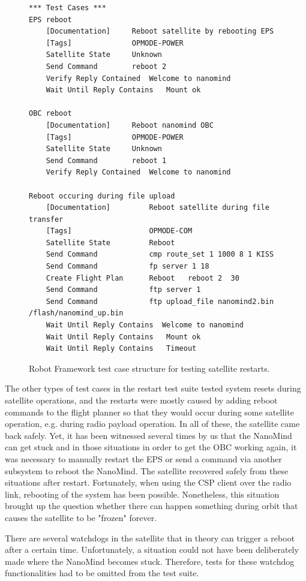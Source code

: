 \documentclass[english,12pt,a4paper,pdftex,elec,utf8]{aaltothesis}
\begin{document}
\begin{figure}[h!]
\centering
\begin{verbatim}
*** Test Cases ***
EPS reboot
	[Documentation]		Reboot satellite by rebooting EPS
	[Tags]				OPMODE-POWER
	Satellite State 	Unknown
	Send Command		reboot 2
	Verify Reply Contained 	Welcome to nanomind
    Wait Until Reply Contains   Mount ok

OBC reboot
	[Documentation]		Reboot nanomind OBC
	[Tags]				OPMODE-POWER
	Satellite State 	Unknown
	Send Command		reboot 1
	Verify Reply Contained 	Welcome to nanomind
	
Reboot occuring during file upload
    [Documentation]         Reboot satellite during file transfer
    [Tags]                  OPMODE-COM
    Satellite State         Reboot
    Send Command            cmp route_set 1 1000 8 1 KISS
    Send Command            fp server 1 18
    Create Flight Plan      Reboot   reboot 2  30
    Send Command            ftp server 1
    Send Command            ftp upload_file nanomind2.bin /flash/nanomind_up.bin
    Wait Until Reply Contains  Welcome to nanomind
    Wait Until Reply Contains   Mount ok
    Wait Until Reply Contains   Timeout
\end{verbatim}
\caption{Robot Framework test case structure for testing satellite restarts.}
\label{robotreboot}
\end{figure}
The other types of test cases in the restart test suite tested system resets during satellite operations, and the restarts were mostly caused by adding reboot commands to the flight planner so that they would occur during some satellite operation, e.g. during radio payload operation. In all of these, the satellite came back safely. Yet, it has been witnessed several times by us that the NanoMind can get stuck and in those situations in order to get the OBC working again, it was necessary to manually restart the EPS or send a command via another subsystem to reboot the NanoMind. The satellite recovered safely from these situations after restart. Fortunately, when using the CSP client over the radio link, rebooting of the system has been possible. Nonetheless, this situation brought up the question whether there can happen something during orbit that causes the satellite to be "frozen" forever.\par
There are several watchdogs in the satellite that in theory can trigger a reboot after a certain time. Unfortunately, a situation could not have been deliberately made where the NanoMind becomes stuck. Therefore, tests for these watchdog functionalities had to be omitted from the test suite.\\
\end{document}
